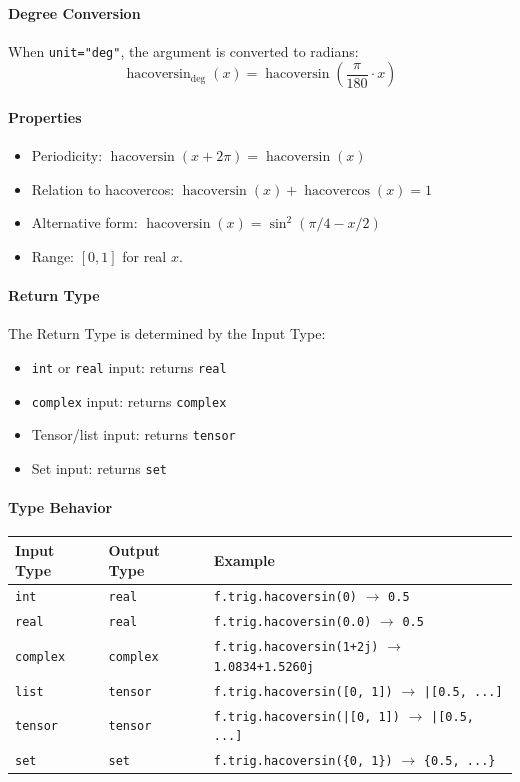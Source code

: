 \paragraph{Degree Conversion}
When \texttt{unit="deg"}, the argument is converted to radians:
\[
\operatorname{hacoversin}_{\text{deg}}(x) = \operatorname{hacoversin}\left(\frac{\pi}{180} \cdot x\right)
\]

\paragraph{Properties}
\begin{itemize}
\item Periodicity: $\operatorname{hacoversin}(x + 2\pi) = \operatorname{hacoversin}(x)$
\item Relation to hacovercos: $\operatorname{hacoversin}(x) + \operatorname{hacovercos}(x) = 1$
\item Alternative form: $\operatorname{hacoversin}(x) = \sin^2(\pi/4 - x/2)$
\item Range: $[0, 1]$ for real $x$.
\end{itemize}

\paragraph{Return Type}
The Return Type is determined by the Input Type:
\begin{itemize}
\item \texttt{int} or \texttt{real} input: returns \texttt{real}
\item \texttt{complex} input: returns \texttt{complex}
\item Tensor/list input: returns \texttt{tensor}
\item Set input: returns \texttt{set}
\end{itemize}

\paragraph{Type Behavior}
\begin{center}
\begin{tabular}{lll}
\textbf{Input Type} & \textbf{Output Type} & \textbf{Example} \\ \hline
\texttt{int} & \texttt{real} & \texttt{f.trig.hacoversin(0)} $\to$ \texttt{0.5} \\
\texttt{real} & \texttt{real} & \texttt{f.trig.hacoversin(0.0)} $\to$ \texttt{0.5} \\
\texttt{complex} & \texttt{complex} & \texttt{f.trig.hacoversin(1+2j)} $\to$ \texttt{1.0834+1.5260j} \\
\texttt{list} & \texttt{tensor} & \texttt{f.trig.hacoversin([0, 1])} $\to$ \texttt{|[0.5, ...]} \\
\texttt{tensor} & \texttt{tensor} & \texttt{f.trig.hacoversin(|[0, 1])} $\to$ \texttt{|[0.5, ...]} \\
\texttt{set} & \texttt{set} & \texttt{f.trig.hacoversin(\{0, 1\})} $\to$ \texttt{\{0.5, ...\}} \\
\end{tabular}
\end{center}

